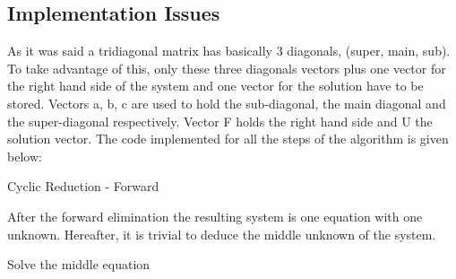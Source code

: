 \subsection{Implementation Issues}
As it was said a tridiagonal matrix has basically 3 diagonals, (super, main, sub). To take advantage of this, only these three diagonals vectors plus one vector for the right hand side of the system and one vector for the solution have to be stored.
Vectors a, b, c are used to hold the  sub-diagonal, the main diagonal and the super-diagonal respectively. Vector F holds the right hand side and U the solution vector. The code implemented for all the steps of the algorithm is given below: \\
\begin{algorithm}[H]
\begin{algorithmic}[1]
        \State{\hspace*{2cm}\}}
      \State{\}} 
\EndFunction
\end{algorithmic}
\caption{Cyclic Reduction - Forward}
\label{alg:forward_cr}
\end{algorithm}
After the forward elimination the resulting system is one equation with one unknown. Hereafter, it is trivial to deduce the middle unknown of the system. 
\begin{algorithm}[H]
\begin{algorithmic}[1]
\EndFunction
\end{algorithmic}
\caption{Solve the middle equation}
\label{alg:Find middle}
\end{algorithm}
